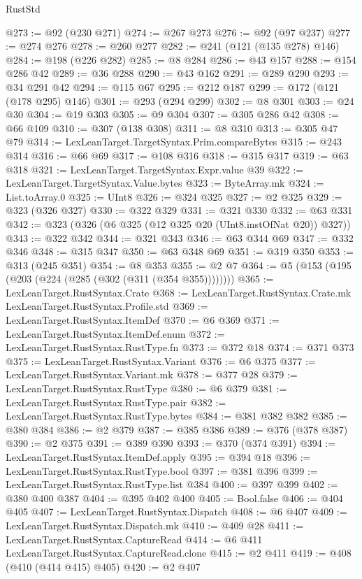 \begin{lexlean}{RustStd}
\begin{coremodule}
@273 := @92 (@230 @271)
@274 := @267 @273
@276 := @92 (@97 @237)
@277 := @274 @276
@278 := @260 @277
@282 := @241 (@121 (@135 @278) @146)
@284 := @198 (@226 @282)
@285 := @8 @284
@286 := @43 @157
@288 := @154 @286 @42
@289 := @36 @288
@290 := @43 @162
@291 := @289 @290
@293 := @34 @291 @42
@294 := @115 @67
@295 := @212 @187
@299 := @172 (@121 (@178 @295) @146)
@301 := @293 (@294 @299)
@302 := @8 @301
@303 := @24 @30
@304 := @19 @303
@305 := @9 @304
@307 := @305 @286 @42
@308 := @66 @109
@310 := @307 (@138 @308)
@311 := @8 @310
@313 := @305 @47 @79
@314 := LexLeanTarget.TargetSyntax.Prim.compareBytes
@315 := @243 @314
@316 := @66 @69
@317 := @108 @316
@318 := @315 @317
@319 := @63 @318
@321 := LexLeanTarget.TargetSyntax.Expr.value @39
@322 := LexLeanTarget.TargetSyntax.Value.bytes
@323 := ByteArray.mk
@324 := List.toArray.{0}
@325 := UInt8
@326 := @324 @325
@327 := @2 @325
@329 := @323 (@326 @327)
@330 := @322 @329
@331 := @321 @330
@332 := @63 @331
@342 := @323 (@326 (@6 @325 (@12 @325 @20 (UInt8.instOfNat @20)) @327))
@343 := @322 @342
@344 := @321 @343
@346 := @63 @344 @69
@347 := @332 @346
@348 := @315 @347
@350 := @63 @348 @69
@351 := @319 @350
@353 := @313 (@245 @351)
@354 := @8 @353
@355 := @2 @7
@364 := @5 (@153 (@195 (@203 (@224 (@285 (@302 (@311 (@354 @355))))))))
@365 := LexLeanTarget.RustSyntax.Crate
@368 := LexLeanTarget.RustSyntax.Crate.mk LexLeanTarget.RustSyntax.Profile.std
@369 := LexLeanTarget.RustSyntax.ItemDef
@370 := @6 @369
@371 := LexLeanTarget.RustSyntax.ItemDef.enum
@372 := LexLeanTarget.RustSyntax.RustType.fn
@373 := @372 @18
@374 := @371 @373
@375 := LexLeanTarget.RustSyntax.Variant
@376 := @6 @375
@377 := LexLeanTarget.RustSyntax.Variant.mk
@378 := @377 @28
@379 := LexLeanTarget.RustSyntax.RustType
@380 := @6 @379
@381 := LexLeanTarget.RustSyntax.RustType.pair
@382 := LexLeanTarget.RustSyntax.RustType.bytes
@384 := @381 @382 @382
@385 := @380 @384
@386 := @2 @379
@387 := @385 @386
@389 := @376 (@378 @387)
@390 := @2 @375
@391 := @389 @390
@393 := @370 (@374 @391)
@394 := LexLeanTarget.RustSyntax.ItemDef.apply
@395 := @394 @18
@396 := LexLeanTarget.RustSyntax.RustType.bool
@397 := @381 @396
@399 := LexLeanTarget.RustSyntax.RustType.list @384
@400 := @397 @399
@402 := @380 @400 @387
@404 := @395 @402 @400
@405 := Bool.false
@406 := @404 @405
@407 := LexLeanTarget.RustSyntax.Dispatch
@408 := @6 @407
@409 := LexLeanTarget.RustSyntax.Dispatch.mk
@410 := @409 @28
@411 := LexLeanTarget.RustSyntax.CaptureRead
@414 := @6 @411 LexLeanTarget.RustSyntax.CaptureRead.clone
@415 := @2 @411
@419 := @408 (@410 (@414 @415) @405)
@420 := @2 @407

\end{coremodule}
\end{lexlean}
